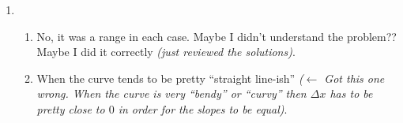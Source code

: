 \documentclass[]{article}
\begin{document}
\begin{enumerate}
	\item \begin{enumerate}
		\item No, it was a range in each case. Maybe I didn't understand the problem?? Maybe I did it correctly \textit{(just reviewed the solutions)}.
		\item When the curve tends to be pretty ``straight line-ish'' \textit{($\leftarrow$ Got this one wrong. When the curve is very ``bendy'' or ``curvy'' then $\Delta x$ has to be pretty close to $0$ in order for the slopes to be equal)}.
	\end{enumerate}

\end{enumerate}
\end{document}
